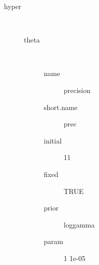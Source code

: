 \begin{description}
	\item[hyper]\ 
	 \begin{description}
	 	\item[theta]\ 
	 	 \begin{description}
	 	 	 \item[ name ] precision 
	 	 	 \item[ short.name ] prec 
	 	 	 \item[ initial ] 11 
	 	 	 \item[ fixed ] TRUE 
	 	 	 \item[ prior ] loggamma 
	 	 	 \item[ param ] 1 1e-05 
	 	 \end{description}
	 \end{description}
\end{description}
